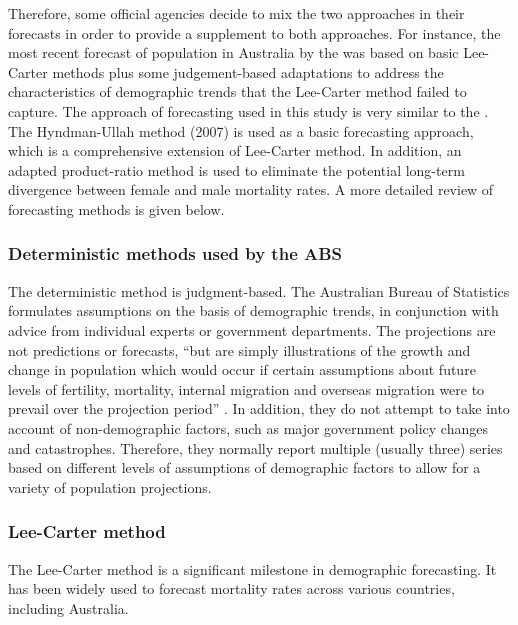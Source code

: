 \documentclass[11pt,a4paper,]{article}
\begin{document}
Therefore, some official agencies decide to mix the two approaches in their forecasts in order to provide a supplement to both approaches. For instance, the most recent forecast of population in Australia by the \textcite{PC13} was based on basic Lee-Carter methods plus some judgement-based adaptations to address the characteristics of demographic trends that the Lee-Carter method failed to capture. The approach of forecasting used in this study is very similar to the \textcite{PC13}. The Hyndman-Ullah method (2007) is used as a basic forecasting approach, which is a comprehensive extension of Lee-Carter method. In addition, an adapted product-ratio method is used to eliminate the potential long-term divergence between female and male mortality rates. A more detailed review of forecasting methods is given below.

\hypertarget{deterministic-methods-used-by-the-abs}{%
\subsubsection{Deterministic methods used by the ABS}\label{deterministic-methods-used-by-the-abs}}

The deterministic method is judgment-based. The Australian Bureau of Statistics formulates assumptions on the basis of demographic trends, in conjunction with advice from individual experts or government departments. The projections are not predictions or forecasts, ``but are simply illustrations of the growth and change in population which would occur if certain assumptions about future levels of fertility, mortality, internal migration and overseas migration were to prevail over the projection period'' \autocite[p.2]{ABS12}. In addition, they do not attempt to take into account of non-demographic factors, such as major government policy changes and catastrophes. Therefore, they normally report multiple (usually three) series based on different levels of assumptions of demographic factors to allow for a variety of population projections.

\hypertarget{lee-carter-method}{%
\subsubsection{Lee-Carter method}\label{lee-carter-method}}

The Lee-Carter method \autocite{LC92} is a significant milestone in demographic forecasting. It has been widely used to forecast mortality rates across various countries, including Australia.
\end{document}
